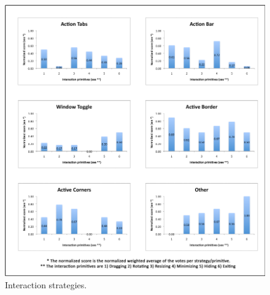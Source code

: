 \begin{figure}[]
  \caption{Interaction strategies.}
  \centering
    \includegraphics[]{images/stratHistog}
\end{figure}


